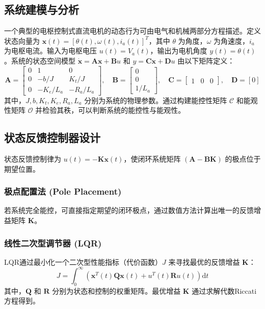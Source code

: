 \documentclass[12pt, a4paper]{article}
\begin{document}
\subsection{系统建模与分析}
一个典型的电枢控制式直流电机的动态行为可由电气和机械两部分方程描述。定义状态向量为 $\bm{x}(t) = [\theta(t), \omega(t), i_a(t)]^T$，其中 $\theta$ 为角度，$\omega$ 为角速度，$i_a$ 为电枢电流。输入为电枢电压 $u(t)=V_a(t)$，输出为电机角度 $y(t)=\theta(t)$。系统的状态空间模型 $\dot{\bm{x}} = \bm{A}\bm{x} + \bm{B}u$ 和 $y = \bm{C}\bm{x} + \bm{D}u$ 由以下矩阵定义：
\begin{equation}
    \bm{A} = 
    \begin{bmatrix}
        0 & 1 & 0 \\
        0 & -b/J & K_t/J \\
        0 & -K_e/L_a & -R_a/L_a
    \end{bmatrix},
    \quad
    \bm{B} = 
    \begin{bmatrix}
        0 \\ 0 \\ 1/L_a
    \end{bmatrix},
    \quad
    \bm{C} = 
    \begin{bmatrix}
        1 & 0 & 0
    \end{bmatrix},
    \quad
    \bm{D} = [0]
    \label{eq:ss_model}
\end{equation}
其中，$J, b, K_t, K_e, R_a, L_a$ 分别为系统的物理参数。通过构建能控性矩阵 $\mathcal{C}$ 和能观性矩阵 $\mathcal{O}$ 并检验其秩，可以判断系统的能控性与能观性。

\subsection{状态反馈控制器设计}
状态反馈控制律为 $u(t) = - \bm{K}\bm{x}(t)$，使闭环系统矩阵 $(\bm{A} - \bm{B}\bm{K})$ 的极点位于期望位置。
\subsubsection{极点配置法 (Pole Placement)}
若系统完全能控，可直接指定期望的闭环极点，通过数值方法计算出唯一的反馈增益矩阵 $\bm{K}$。
\subsubsection{线性二次型调节器 (LQR)}
LQR通过最小化一个二次型性能指标（代价函数）$J$ 来寻找最优的反馈增益 $\bm{K}$：
\begin{equation}
    J = \int_{0}^{\infty} \left( \bm{x}^T(t)\bm{Q}\bm{x}(t) + u^T(t)\bm{R}u(t) \right) \mathrm{d}t
    \label{eq:lqr_cost}
\end{equation}
其中，$\bm{Q}$ 和 $\bm{R}$ 分别为状态和控制的权重矩阵。最优增益 $\bm{K}$ 通过求解代数Riccati方程得到。
\end{document}
